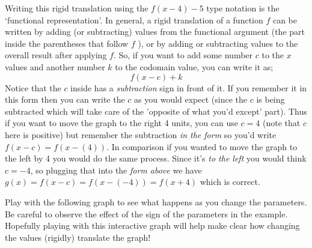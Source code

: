 \documentclass{ximeraXloud}
\begin{document}
    
    Writing this rigid translation using the $f(x-4)-5$ type notation is the `functional representation'. In general, a rigid translation of a function $f$ can be written by adding (or subtracting) values from the functional argument (the part inside the parentheses that follow $ f $ ), or by adding or subtracting values to the overall result after applying $f$. So, if you want to add some number $c$ to the $x$ values and another number $k$ to the codomain value, you can write it as;
    \[
        f(x - c) + k
    \]
    Notice that the $c$ inside has a \textit{subtraction} sign in front of it. If you remember it in this form then you can write the $c$ as you would expect (since the $c$ is being subtracted which will take care of the 'opposite of what you'd except' part). Thus if you want to move the graph to the right 4 units, you can use $c=4$ (note that $c$ here is positive) but remember the subtraction \textit{in the form} so you'd write $f(x - c) = f(x - (4))$. In comparison if you wanted to move the graph to the left by 4 you would do the same process. Since it's \textit{to the left} you would think $c = -4$, so plugging that into the \textit{form above} we have $g(x) = f(x - c) = f(x - (-4) ) = f(x+4)$ which is correct.
    
    Play with the following graph to see what happens as you change the parameters. Be careful to observe the effect of the sign of the parameters in the example. Hopefully playing with this interactive graph will help make clear how changing the values (rigidly) translate the graph!
    
    
\end{document}
